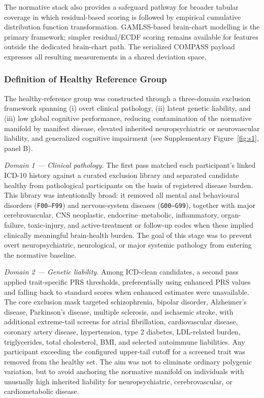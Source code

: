 \documentclass[11pt,a4paper,twoside]{article}
\begin{document}
The normative stack also provides a safeguard pathway for broader tabular coverage in which residual-based scoring is followed by empirical cumulative distribution function transformation. GAMLSS-based brain-chart modelling is the primary framework; simpler residual/ECDF scoring remains available for features outside the dedicated brain-chart path. The serialized COMPASS payload expresses all resulting measurements in a shared deviation space.

\subsubsection{Definition of Healthy Reference Group}
The healthy-reference group was constructed through a three-domain exclusion framework spanning (i) overt clinical pathology, (ii) latent genetic liability, and (iii) low global cognitive performance, reducing contamination of the normative manifold by manifest disease, elevated inherited neuropsychiatric or neurovascular liability, and generalized cognitive impairment (see Supplementary Figure~\ref{fig:s1}, panel B).

\textit{Domain 1 --- Clinical pathology.} The first pass matched each participant's linked ICD-10 history against a curated exclusion library and separated candidate healthy from pathological participants on the basis of registered disease burden. This library was intentionally broad: it removed all mental and behavioural disorders (\texttt{F00--F99}) and nervous-system diseases (\texttt{G00--G99}), together with major cerebrovascular, CNS neoplastic, endocrine--metabolic, inflammatory, organ-failure, toxic-injury, and active-treatment or follow-up codes when these implied clinically meaningful brain-health burden. The goal of this stage was to prevent overt neuropsychiatric, neurological, or major systemic pathology from entering the normative baseline.

\textit{Domain 2 --- Genetic liability.} Among ICD-clean candidates, a second pass applied trait-specific PRS thresholds, preferentially using enhanced PRS values and falling back to standard scores when enhanced estimates were unavailable. The core exclusion mask targeted schizophrenia, bipolar disorder, Alzheimer's disease, Parkinson's disease, multiple sclerosis, and ischaemic stroke, with additional extreme-tail screens for atrial fibrillation, cardiovascular disease, coronary artery disease, hypertension, type 2 diabetes, LDL-related burden, triglycerides, total cholesterol, BMI, and selected autoimmune liabilities. Any participant exceeding the configured upper-tail cutoff for a screened trait was removed from the healthy set. The aim was not to eliminate ordinary polygenic variation, but to avoid anchoring the normative manifold on individuals with unusually high inherited liability for neuropsychiatric, cerebrovascular, or cardiometabolic disease.
\end{document}
